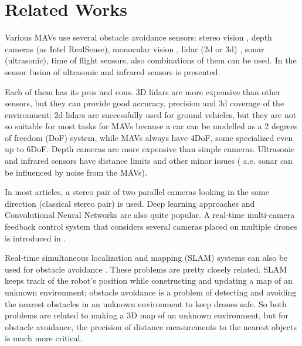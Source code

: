 \section{Related Works}
Various MAVs use several obstacle avoidance sensors: stereo vision \cite{Ruf2018}, depth cameras (as Intel RealSense), monocular vision \cite{Mejias2010}, lidar (2d or 3d) \cite{Ramasamy2016}, sonar (ultrasonic), time of flight sensors, also combinations of them can be used. 
In \cite{Rambabu2015} the sensor fusion of ultrasonic and infrared sensors is presented.

Each of them has its pros and cons. 
3D lidars are more expensive than other sensors, but they can provide good accuracy, precision and 3d coverage of the environment; 2d lidars are successfully used for ground vehicles, but they are not so suitable for most tasks for MAVs because a car can be modelled as a 2 degrees of freedom (DoF) system, while MAVs always have 4DoF, some specialized even up to 6DoF. 
Depth cameras are more expensive than simple cameras. Ultrasonic and infrared sensors have distance limits and other minor issues ( a.e. sonar can be influenced by noise from the MAVs). 

In most articles, a stereo pair of two parallel cameras looking in the same direction (classical stereo pair) \cite{Lin2021, Xiao2019} is used.
Deep learning approaches \cite{Back2020, FragaLamas2019, Park2020, Roghair2021} and Convolutional Neural Networks \cite{Yu2013, Ma2020} are also quite popular.
A real-time multi-camera feedback control system that considers several cameras placed on multiple drones is introduced in \cite{He2021}.

Real-time simultaneous localization and mapping (SLAM) systems can also be used for obstacle avoidance \cite{Moreno2014}. 
These problems are pretty closely related. 
SLAM keeps track of the robot's position while constructing and updating a map of an unknown environment; obstacle avoidance is a problem of detecting and avoiding the nearest obstacles in an unknown environment to keep drones safe.
So both problems are related to making a 3D map of an unknown environment, but for obstacle avoidance, the precision of distance measurements to the nearest objects is much more critical.

